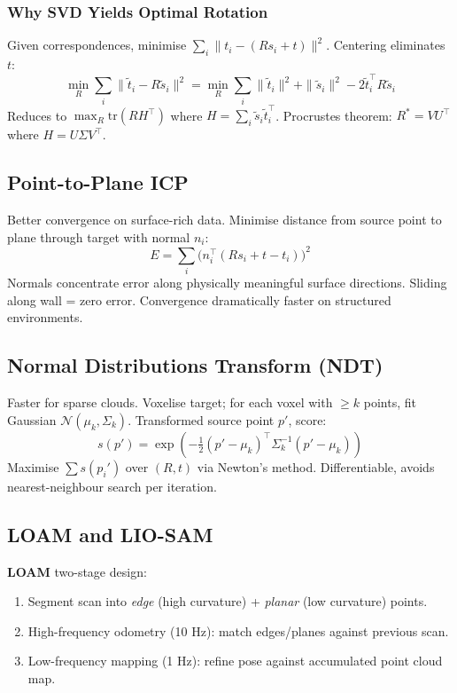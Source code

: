 \documentclass[11pt,a4paper]{article}
\begin{document}
\subsubsection{Why SVD Yields Optimal Rotation}

Given correspondences, minimise $\sum_i \|t_i - (R s_i + t)\|^2$. Centering eliminates $t$:
\[
\min_R \sum_i \|\tilde{t}_i - R\tilde{s}_i\|^2 = \min_R \sum_i \|\tilde{t}_i\|^2 + \|\tilde{s}_i\|^2 - 2\tilde{t}_i^\top R\tilde{s}_i
\]
Reduces to $\max_R \mathrm{tr}(R H^\top)$ where $H = \sum_i \tilde{s}_i \tilde{t}_i^\top$. Procrustes theorem: $R^* = V U^\top$ where $H = U \Sigma V^\top$.

\subsection{Point-to-Plane ICP}

Better convergence on surface-rich data. Minimise distance from source point to plane through target with normal $n_i$:
\[
E = \sum_i \big(n_i^\top(R s_i + t - t_i)\big)^2
\]
Normals concentrate error along physically meaningful surface directions. Sliding along wall = zero error. Convergence dramatically faster on structured environments.

\subsection{Normal Distributions Transform (NDT)}

Faster for sparse clouds. Voxelise target; for each voxel with $\geq k$ points, fit Gaussian $\mathcal{N}(\mu_k, \Sigma_k)$. Transformed source point $p'$, score:
\[
s(p') = \exp\!\left(-\tfrac{1}{2}(p' - \mu_k)^\top \Sigma_k^{-1}(p' - \mu_k)\right)
\]
Maximise $\sum s(p_i')$ over $(R, t)$ via Newton's method. Differentiable, avoids nearest-neighbour search per iteration.

\subsection{LOAM and LIO-SAM}

\textbf{LOAM} two-stage design:
\begin{enumerate}
\item Segment scan into \emph{edge} (high curvature) + \emph{planar} (low curvature) points.
\item High-frequency odometry (10 Hz): match edges/planes against previous scan.
\item Low-frequency mapping (1 Hz): refine pose against accumulated point cloud map.
\end{enumerate}
\end{document}
